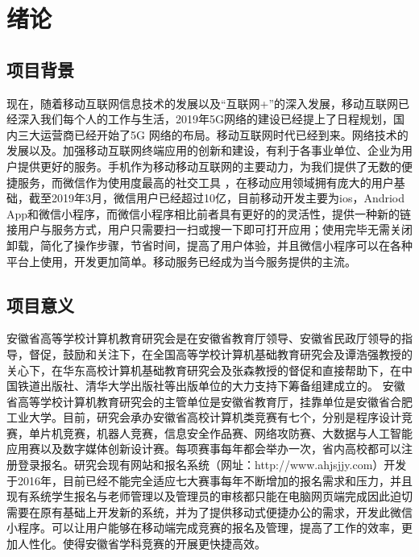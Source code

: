 \documentclass[a4paper]{ltxdoc}
\begin{document}
	{
		\setcounter{page}{1}
		\pretocmd{\section}{\clearpage \vspace*{-2.0em}}{}{}
		
		\setlength{\parindent}{2em}
		\setlength{\parskip}{0.5em}
		\setlength{\baselineskip}{22pt}
		
		\section{绪论}
		\subsection{项目背景}
		现在，随着移动互联网信息技术的发展以及“互联网+”的深入发展，移动互联网已经深入我们每个人的工作与生活，2019年5G网络的建设已经提上了日程规划，国内三大运营商已经开始了5G 网络的布局。移动互联网时代已经到来。网络技术的发展以及。加强移动互联网终端应用的创新和建设，有利于各事业单位、企业为用户提供更好的服务。手机作为移动移动互联网的主要动力，为我们提供了无数的便捷服务，而微信作为使用度最高的社交工具 ，在移动应用领域拥有庞大的用户基础，截至2019年3月，微信用户已经超过10亿，目前移动开发主要为ios，Andriod App和微信小程序，而微信小程序相比前者具有更好的的灵活性，提供一种新的链接用户与服务方式，用户只需要扫一扫或搜一下即可打开应用；使用完毕无需关闭卸载，简化了操作步骤，节省时间，提高了用户体验，并且微信小程序可以在各种平台上使用，开发更加简单。移动服务已经成为当今服务提供的主流。
		
		\subsection{项目意义}
		安徽省高等学校计算机教育研究会是在安徽省教育厅领导、安徽省民政厅领导的指导，督促，鼓励和关注下，在全国高等学校计算机基础教育研究会及谭浩强教授的关心下，在华东高校计算机基础教育研究会及张森教授的督促和直接帮助下，在中国铁道出版社、清华大学出版社等出版单位的大力支持下筹备组建成立的。 安徽省高等学校计算机教育研究会的主管单位是安徽省教育厅，挂靠单位是安徽省合肥工业大学。目前，研究会承办安徽省高校计算机类竞赛有七个，分别是程序设计竞赛，单片机竞赛，机器人竞赛，信息安全作品赛、网络攻防赛、大数据与人工智能应用赛以及数字媒体创新设计赛。每项赛事每年都会举办一次，省内高校都可以注册登录报名。研究会现有网站和报名系统（网址：http://www.ahjsjjy.com）开发于2016年，目前已经不能完全适应七大赛事每年不断增加的报名需求和压力，并且现有系统学生报名与老师管理以及管理员的审核都只能在电脑网页端完成因此迫切需要在原有基础上开发新的系统，并为了提供移动式便捷办公的需求，开发此微信小程序。可以让用户能够在移动端完成竞赛的报名及管理，提高了工作的效率，更加人性化。使得安徽省学科竞赛的开展更快捷高效。
		
}
\end{document}
